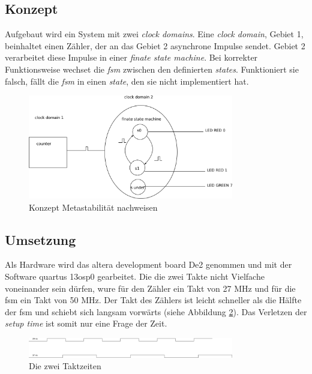 \subsection{Konzept}\label{sect.metastabil_ansatz}
Aufgebaut wird ein System mit zwei \textit{clock domains}. Eine \textit{clock domain}, Gebiet 1,  beinhaltet einen Zähler, der an das Gebiet 2 asynchrone Impulse sendet. Gebiet 2 verarbeitet diese Impulse in einer \textit{finate state machine}. Bei korrekter Funktionsweise wechset die \textit{fsm} zwischen den definierten \textit{states}. Funktioniert sie falsch, fällt die \textit{fsm} in einen \textit{state}, den sie nicht implementiert hat.\\

\begin{figure}[H]
	\centering
	\includegraphics[width=0.8\textwidth]{images/metastability/konzept.png}
	\caption{Konzept Metastabilität nachweisen}
	\label{fig.metastabil.fsm}
\end{figure}


\subsection{Umsetzung}\label{sect.metastabil_implementation}
Als Hardware wird das altera development board De2 genommen und mit der Software quartus 13osp0 gearbeitet. Die die zwei Takte nicht Vielfache voneinander sein dürfen, wure für den Zähler ein Takt von 27 MHz und für die fsm ein Takt von 50 MHz. Der Takt des Zählers ist leicht schneller als die Hälfte der fsm und schiebt sich langsam vorwärts (siehe Abbildung \ref{fig.metastabil.takte}). Das Verletzen der \textit{setup time} ist somit nur eine Frage der Zeit.

\begin{figure}[H]
	\centering
	\includegraphics[width=0.8\textwidth]{images/metastability/2_takte.png}
	\caption{Die zwei Taktzeiten}
	\label{fig.metastabil.takte}
\end{figure}

